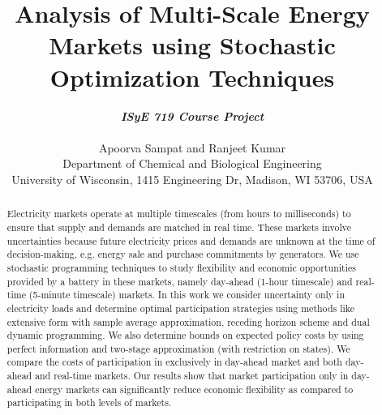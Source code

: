 \documentclass[11pt,twoside]{article}
\begin{document}
\title{Analysis of Multi-Scale Energy Markets using Stochastic Optimization Techniques}

\author{\textbf{\textit{ISyE 719 Course Project}}\\ \\Apoorva Sampat and Ranjeet Kumar\\
 {\small Department of Chemical and Biological Engineering}\\
 {\small \;University of Wisconsin, 1415 Engineering Dr, Madison, WI 53706, USA}}
\date{}
\maketitle

\begin{abstract}
Electricity markets operate at multiple timescales (from hours to milliseconds) to ensure that supply and demands are matched in real time. These markets involve uncertainties because future electricity prices and demands are unknown at the time of decision-making, e.g. energy sale and purchase commitments by generators. We use stochastic programming techniques to study flexibility and economic opportunities provided by a battery in these markets, namely day-ahead (1-hour timescale) and real-time (5-minute timescale) markets. In this work we consider uncertainty only in electricity loads and determine optimal participation strategies using methods like extensive form with sample average approximation, receding horizon scheme and dual dynamic programming. We also determine bounds on expected policy costs by using perfect information and two-stage approximation (with restriction on states). We compare the costs of participation in exclusively in day-ahead market and both day-ahead and real-time markets. Our results show that market participation only in day-ahead energy markets can significantly reduce economic flexibility as compared to participating in both levels of markets.
\end{abstract}
\end{document}
